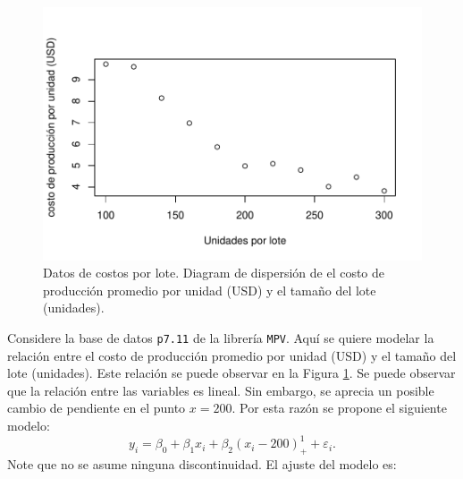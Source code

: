 \documentclass[
]{article}
\newenvironment{Shaded}{\begin{snugshade}}{\end{snugshade}}
\newcommand{\AttributeTok}[1]{\textcolor[rgb]{0.77,0.63,0.00}{#1}}
\newcommand{\DecValTok}[1]{\textcolor[rgb]{0.00,0.00,0.81}{#1}}
\newcommand{\FloatTok}[1]{\textcolor[rgb]{0.00,0.00,0.81}{#1}}
\newcommand{\FunctionTok}[1]{\textcolor[rgb]{0.00,0.00,0.00}{#1}}
\newcommand{\NormalTok}[1]{#1}
\newcommand{\OtherTok}[1]{\textcolor[rgb]{0.56,0.35,0.01}{#1}}
\newcommand{\SpecialCharTok}[1]{\textcolor[rgb]{0.00,0.00,0.00}{#1}}
\begin{document}
\begin{figure}

{\centering \includegraphics{MLG2_files/figure-latex/LotesFigure-1} 

}

\caption{Datos de costos por lote. Diagram de dispersión de el costo de producción promedio por unidad (USD) y el tamaño del lote (unidades).}\label{fig:LotesFigure}
\end{figure}

Considere la base de datos \texttt{p7.11} de la librería \texttt{MPV}. Aquí se quiere modelar la relación entre el costo de producción promedio por unidad (USD) y el tamaño del lote (unidades). Este relación se puede observar en la Figura \ref{fig:LotesFigure}. Se puede observar que la relación entre las variables es lineal. Sin embargo, se aprecia un posible cambio de pendiente en el punto \(x=200\). Por esta razón se propone el siguiente modelo:
\[
y_{i} = \beta_{0} + \beta_{1}x_{i} + \beta_{2}(x_{i}-200)_{+}^{1} + \varepsilon_{i}.
\]
Note que no se asume ninguna discontinuidad. El ajuste del modelo es:

\begin{Shaded}
\end{Shaded}
\end{document}
